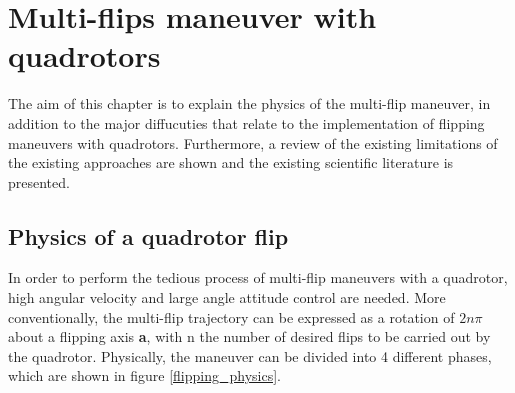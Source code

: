 \documentclass{thesisreport}
\begin{document}
 
 \chapter{Multi-flips maneuver with quadrotors}


The aim of this chapter is to explain the physics of the multi-flip maneuver, in addition to the major diffucuties that relate to the implementation of flipping maneuvers with quadrotors. Furthermore, a review of the existing limitations of the existing approaches are shown and the existing scientific literature is presented. 


\section{Physics of a quadrotor flip}\label{multiflip_physics}


In order to perform the tedious process of multi-flip maneuvers with a quadrotor, high angular velocity and large angle attitude control are needed. More conventionally, the multi-flip trajectory can be expressed as a rotation of $2n \pi$ about a flipping axis \textbf{a}, with n the number of desired flips to be carried out by the quadrotor. Physically, the maneuver can be divided into 4 different phases, which are shown in figure \ref{flipping_physics}.
\end{document}
